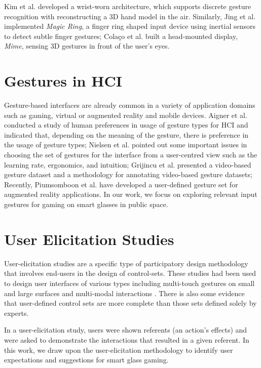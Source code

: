     Kim et al.\cite{Kim:2012:DFI:2380116.2380139} developed a wrist-worn architecture, which supports discrete gesture recognition with reconstructing a 3D hand model in the air. Similarly, Jing et al.\cite{Jing:2013:MRS:2541831.2541875} implemented \textsl{Magic Ring}, a finger ring shaped input device using inertial sensors to detect subtle finger gestures; Cola\c{c}o et al.\cite{Colaco:2013:MCL:2501988.2502042} built a head-mounted display, \textsl{Mime}, sensing 3D gestures in front of the user's eyes. 

    \section{Gestures in HCI}
    Gesture-based interfaces are already common in a variety of application domains such as gaming, virtual or augmented reality and mobile devices\cite{karam2005taxonomy}. Aigner et al.\cite{aigner2012understanding} conducted a study of human preferences in usage of gesture types for HCI and indicated that, depending on the meaning of the gesture, there is preference in the usage of gesture types;
    Nielsen et al.\cite{nielsen2004procedure} pointed out some important issues in choosing the set of gestures for the interface from a user-centred view such as the learning rate, ergonomics, and intuition;
    Grijincu et al.\cite{Grijincu:2014:UIG:2669485.2669511} presented a video-based gesture dataset and a methodology for annotating video-based gesture datasets; 
    Recently, Piumsomboon et al.\cite{Piumsomboon:2013:UGA:2468356.2468527} have developed a user-defined gesture set for augmented reality applications. In our work, we focus on exploring relevant input gestures for gaming on smart glasses in public space.

    \section{User Elicitation Studies}
    User-elicitation studies are a specific type of participatory design methodology that involves end-users in the design of control-sets\cite{Morris:2012:WWI:2396636.2396651}. These studies had been used to design user interfaces of various types including multi-touch gestures on small and large surfaces\cite{Anthony:2012:IRC:2396636.2396671,Wobbrock:2009:UGS:1518701.1518866} and multi-modal interactions \cite{Morris:2012:WWI:2396636.2396651,Liang:2012:USG:2350046.2350098}. There is also some evidence that user-defined control sets are more complete than those sets defined solely by experts\cite{Pyryeskin:2012:CEG:2396636.2396638,Wobbrock:2009:UGS:1518701.1518866}.

    In a user-elicitation study, users were shown referents (an action's effects) and were asked to demonstrate the interactions that resulted in a given referent\cite{Wobbrock:2009:UGS:1518701.1518866}. In this work, we draw upon the user-elicitation methodology to identify user expectations and suggestions for smart glass gaming.
